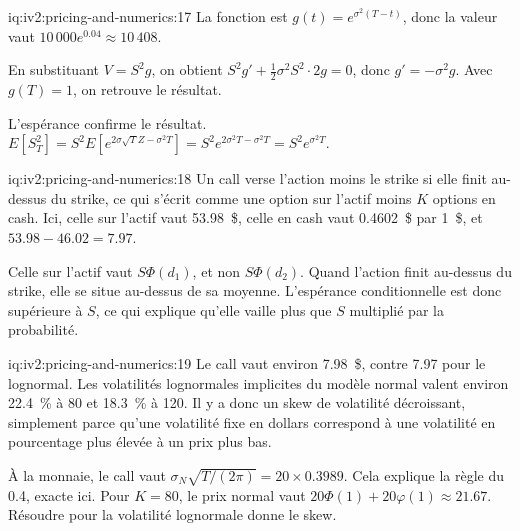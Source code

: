 \begin{solution}{iq:iv2:pricing-and-numerics:17}
La fonction est $g(t) = e^{\sigma^2(T - t)}$, donc la valeur vaut $10\,000e^{0.04} \approx 10\,408$.

En substituant $V = S^2g$, on obtient $S^2g' + \tfrac12\sigma^2S^2 \cdot 2g = 0$, donc $g' = -\sigma^2g$. Avec $g(T) = 1$, on retrouve le résultat.

L'espérance confirme le résultat. $E[S_T^2] = S^2E[e^{2\sigma\sqrt T Z - \sigma^2T}] = S^2e^{2\sigma^2T - \sigma^2T} = S^2e^{\sigma^2T}$.

\end{solution}

\begin{solution}{iq:iv2:pricing-and-numerics:18}
Un call verse l'action moins le strike si elle finit au-dessus du strike, ce qui s'écrit comme une option sur l'actif moins $K$ options en cash. Ici, celle sur l'actif vaut 53.98~\$, celle en cash vaut 0.4602~\$ par 1~\$, et $53.98 - 46.02 = 7.97$.

Celle sur l'actif vaut $S\Phi(d_1)$, et non $S\Phi(d_2)$. Quand l'action finit au-dessus du strike, elle se situe au-dessus de sa moyenne. L'espérance conditionnelle est donc supérieure à $S$, ce qui explique qu'elle vaille plus que $S$ multiplié par la probabilité.

\end{solution}

\begin{solution}{iq:iv2:pricing-and-numerics:19}
Le call vaut environ 7.98~\$, contre 7.97 pour le lognormal. Les volatilités lognormales implicites du modèle normal valent environ 22.4~\% à 80 et 18.3~\% à 120. Il y a donc un skew de volatilité décroissant, simplement parce qu'une volatilité fixe en dollars correspond à une volatilité en pourcentage plus élevée à un prix plus bas.

À la monnaie, le call vaut $\sigma_N\sqrt{T/(2\pi)} = 20 \times 0.3989$. Cela explique la règle du 0.4, exacte ici. Pour $K = 80$, le prix normal vaut $20\Phi(1) + 20\varphi(1) \approx 21.67$. Résoudre pour la volatilité lognormale donne le skew.

\end{solution}

